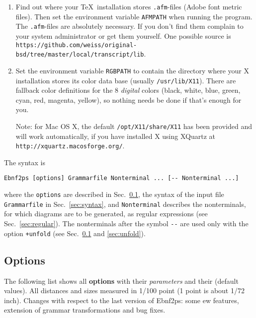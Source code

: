 \documentclass{article}
\newcommand{\new}{%
        {\ooalign {\hfil \raise .09ex
         \hbox {n}\hfil \crcr\mathhexbox 20D}}}
\begin{document}
\begin{enumerate}
\item Find out where your \TeX\ installation stores
  \texttt{.afm}-files (Adobe font metric files). Then set the
  environment variable \texttt{AFMPATH} when running the program. The
  \texttt{.afm}-files are absolutely necessary. If you don't find them
  complain to your system administrator or get them yourself. One
  possible source is \texttt{https://github.com/weiss/original-bsd/tree/master/local/transcript/lib}.
\item Set the environment variable \texttt{RGBPATH} to contain the
  directory where your X installation stores its color data base
  (usually \texttt{/usr/lib/X11}). There are fallback color
  definitions for the 8 \emph{digital} colors (black, white, blue,
  green, cyan, red, magenta, yellow), so nothing needs be done if
  that's enough for you.

  Note: for Mac OS X, the default \texttt{/opt/X11/share/X11} has been
  provided and will work automatically, if you have installed X using
  XQuartz at \texttt{http://xquartz.macosforge.org/}.
\end{enumerate}

The syntax is
\begin{verbatim}
Ebnf2ps [options] Grammarfile Nonterminal ... [-- Nonterminal ...]
\end{verbatim}
where the \texttt{options} are described in Sec.~\ref{sec:options}, the syntax
of the input file \texttt{Grammarfile} in Sec.~\ref{sec:syntax}, and
\texttt{Nonterminal} describes the nonterminals, for which diagrams are to be
generated, as regular expressions (see Sec.~\ref{sec:regular}). The nonterminals
after the symbol \verb|--| are used only with the option \texttt{+unfold} (see
Sec.~\ref{sec:options} and \ref{sec:unfold}).


\subsection{Options}
\label{sec:options}

The following list shows all \textbf{options} with their \emph{parameters} and
their (default values). All distances and sizes measured in 1/100 point (1 point
is about 1/72 inch). Changes with respect to the last version of Ebnf2ps:
some \new{}ew features, extension of grammar transformations and bug fixes.
\end{document}
